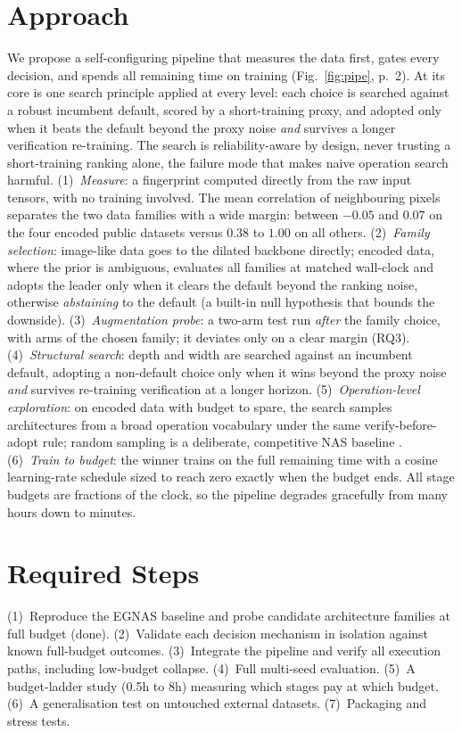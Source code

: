 \documentclass[10pt,twocolumn]{article}
\begin{document}
\section{Approach}
We propose a self-configuring pipeline that measures the data first,
gates every decision, and spends all remaining time on training
(Fig.~\ref{fig:pipe}, p.~2). At its core is one search principle applied
at every level: each choice is searched against a robust incumbent
default, scored by a short-training proxy, and adopted only when it beats
the default beyond the proxy noise \emph{and} survives a longer
verification re-training. The search is reliability-aware by design, never
trusting a short-training ranking alone, the failure mode that makes naive
operation search harmful.
(1)~\emph{Measure}: a fingerprint computed directly from the raw input
tensors, with no training involved. The mean correlation of neighbouring
pixels separates the two data families with a wide margin: between
$-0.05$ and $0.07$ on the four encoded public datasets versus $0.38$ to
$1.00$ on all others. (2)~\emph{Family selection}: image-like data goes to the dilated
backbone directly; encoded data, where the prior is ambiguous, evaluates
all families at matched wall-clock and adopts the leader only when it
clears the default beyond the ranking noise, otherwise \emph{abstaining}
to the default (a built-in null hypothesis that bounds the downside).
(3)~\emph{Augmentation probe}: a two-arm test run \emph{after} the family
choice, with arms of the chosen family; it deviates only on a clear
margin (RQ3).
(4)~\emph{Structural search}: depth and width are searched against an
incumbent default, adopting a non-default choice only when it wins beyond
the proxy noise \emph{and} survives re-training verification at a longer
horizon. (5)~\emph{Operation-level exploration}: on encoded data with
budget to spare, the search samples architectures from a broad operation
vocabulary under the same verify-before-adopt rule; random sampling is a
deliberate, competitive NAS baseline \cite{li2019}. (6)~\emph{Train to budget}: the winner trains on
the full remaining time with a cosine learning-rate schedule \cite{sgdr}
sized to reach zero exactly when the budget ends. All stage budgets are
fractions of the clock, so the pipeline degrades gracefully from many
hours down to minutes.





\section{Required Steps}
(1)~Reproduce the EGNAS baseline and probe candidate architecture
families at full budget (done). (2)~Validate each decision mechanism in
isolation against known full-budget outcomes. (3)~Integrate the pipeline
and verify all execution paths, including low-budget collapse.
(4)~Full multi-seed evaluation. (5)~A budget-ladder study (0.5h to 8h)
measuring which stages pay at which budget. (6)~A generalisation test on
untouched external datasets. (7)~Packaging and stress tests.
\end{document}
